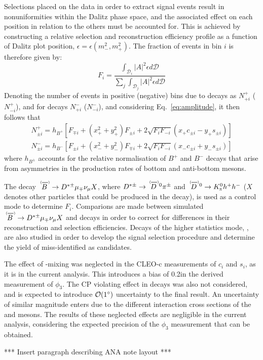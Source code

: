 Selections placed on the data in order to extract signal events result in nonuniformities within the Dalitz phase space, and the associated effect on each position in relation to the others must be accounted for. This is achieved by constructing a relative selection and reconstruction efficiency profile as a function of Dalitz plot position, $\epsilon=\epsilon(m_-^2,m_+^2)$. The fraction of events in bin $i$ is therefore given by:
\begin{equation}
  F_i=\frac{\int_{\mathcal{D}_i}|A|^2\epsilon d\mathcal{D}}{\sum_j\int_{\mathcal{D}_j}|A|^2\epsilon d\mathcal{D}}
\end{equation}
Denoting the number of events in positive (negative) bins due to \Bp decays as $N_{+i}^+$ ($N_{-i}^+$), and for \Bm decays $N_{+i}^-$ ($N_{-i}^-$), and considering Eq.~\ref{eq:amplitude}, it then follows that
\begin{equation}
\begin{aligned}
  N_{\pm i}^+ = h_{B^+}\left[ F_{\mp i} + (x_+^2+y_+^2)F_{\pm i} + 2\sqrt{F_iF_{-i}}(x_+c_{\pm i}-y_+s_{\pm i})\right]
  \\
  N_{\pm i}^- = h_{B^-}\left[ F_{\pm i} + (x_-^2+y_-^2)F_{\mp i} + 2\sqrt{F_iF_{-i}}(x_-c_{\pm i}+y_-s_{\pm i})\right]
\end{aligned}
\end{equation}
where $h_{B^{\pm}}$ accounts for the relative normalisation of $B^+$ and $B^-$ decays that arise from asymmetries in the production rates of bottom and anti-bottom mesons.

The decay $\BorBbar\rightarrow\Dstarpm\mu_{\mp}\nu_{\mu} X$, where $\Dstarpm\to\DorDbar^0\pi^{\pm}$ and $\DorDbar^0\to\KS h^+h^-$ ($X$ denotes other particles that could be produced in the \BorBbar decay), is used as a control mode to determine $F_i$. Comparions are made between simulated $\BorBbar\rightarrow\Dstarpm\mu_{\mp}\nu_{\mu} X$ and \Bpm\to\Dstar\Kpm decays in order to correct for differences in their reconstruction and selection efficiencies. Decays of the higher statistics mode,
\Bpm\to\Dstar\pipm, are also studied in order to develop the signal selection procedure and determine the yield of \Bpm\to\Dstar\pipm miss-identified as \Bpm\to\Dstar\Kpm candidates.

The effect of \Dz-\Dzb mixing was neglected in the CLEO-c measurements of $c_i$ and $s_i$, as it is in the current analysis. This introduces a bias of 0.2\degrees in the derived measurement of $\phi_3$. The CP violating effect in \KS decays was also not considered, and is expected to introduce $\mathcal{O}(1^{\circ})$ uncertainty to the final result. An uncertainty of similar magnitude enters due to the different interaction cross sections of the \Kz and \Kzb mesons. The
results of these neglected effects are negligible in the current analysis, considering the expected precision of the $\phi_3$ measurement that can be obtained.
\begin{center}
  *** Insert paragraph describing ANA note layout ***
\end{center}

